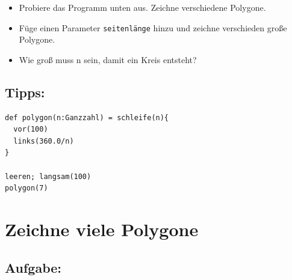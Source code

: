 \begin{itemize}

\item {Probiere das Programm unten aus. Zeichne verschiedene Polygone.}
\item {Füge einen Parameter \lstinline{seitenlänge} hinzu und zeichne verschieden große Polygone.}
\item {Wie groß muss n sein, damit ein Kreis entsteht?}

\end{itemize}


\section*{\color{OliveGreen}Tipps:}

\begin{lstlisting}[basicstyle={\ttfamily\fontsize{18}{22}\selectfont},numbers=none]
def polygon(n:Ganzzahl) = schleife(n){
  vor(100)
  links(360.0/n)
}

leeren; langsam(100)
polygon(7)
\end{lstlisting}
        

  
\chapter{Zeichne viele Polygone}\section*{\color{BrickRed}Aufgabe:}



